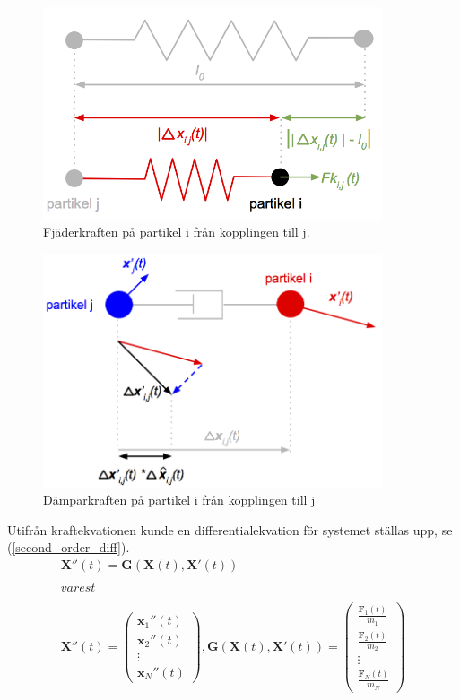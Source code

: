 \documentclass[a4paper,12pt,oneside,final,swedish]{extarticle}
\begin{document}
\begin{figure}[h!]
  \begin{center}
    \includegraphics[width=10cm]{Bilder/Hookes.png} 
  \end{center}
  \caption{Fjäderkraften på partikel i från kopplingen till j.}
  \label{Hookes_image::nonfloat}
\end{figure}
\begin{figure}[h!]
  \begin{center}
    \includegraphics[width=10cm]{Bilder/damper.png} 
  \end{center}
  \caption{Dämparkraften på partikel i från kopplingen till j}
  \label{damper_image::nonfloat}
\end{figure}
Utifrån kraftekvationen kunde en differentialekvation för systemet ställas upp, se (\ref{second_order_diff}).
\begin{equation}
\begin{split}
\mathbf X''(t)=\mathbf G(\mathbf X(t),\mathbf X'(t))\\\\ varest\\\\ \mathbf X''(t)=\begin{pmatrix} \mathbf{ x }_{ 1 }''(t)
\\ \mathbf{ x }_{ 2 }''(t)
\\ \vdots 
\\ \mathbf{ x }_{ N }''(t) \end{pmatrix},      
\mathbf G(\mathbf X(t),\mathbf X'(t))=\begin{pmatrix} \frac { \mathbf{ F }_{ 1 }(t) }{ { m }_{ 1 } } 
\\ \frac { \mathbf{ F }_{ 2 }(t) }{ { m }_{ 2 } }
\\ \vdots 
\\ \frac { \mathbf{ F }_{ N }(t) }{ { m }_{ N } }  \end{pmatrix}
\end{split}
\label{second_order_diff}
\end{equation}
\end{document}
